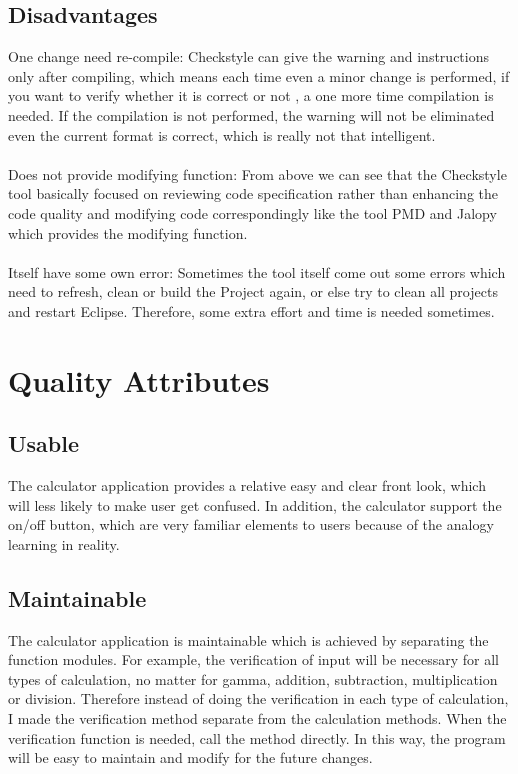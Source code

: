 \documentclass[a4paper, 11pt]{article}
\begin{document}
\subsection{Disadvantages}

One change need re-compile: Checkstyle can give the warning and instructions only after compiling, which means each time even a minor change is performed, if you want to verify whether it is correct or not , a one more time compilation is needed. If the compilation is not performed, the warning will not be eliminated even the current format is correct, which is really not that intelligent. \\\\
\noindent
Does not provide modifying function: From above we can see that the Checkstyle tool  basically focused on reviewing code specification rather than enhancing the code quality and modifying code correspondingly like the tool PMD and Jalopy which provides the modifying function.\\\\
\noindent
Itself have some own error: Sometimes the tool itself come out some errors which need to refresh, clean or build the Project again, or else try to clean all projects and restart Eclipse. Therefore, some extra effort and time is needed sometimes.
\newpage

\section{Quality Attributes}
\subsection{Usable}
\indent\indent The calculator application provides a relative easy and clear front look, which will less likely to make user get confused. In addition, the calculator support the on/off button, which are very familiar elements to users because of the analogy learning in reality. 
\subsection{Maintainable}
\indent\indent The calculator application is maintainable which is achieved by separating the function modules. For example, the verification of input will be necessary for all types of calculation, no matter for gamma, addition, subtraction, multiplication or division. Therefore instead of doing the verification in each type of calculation, I made the verification method separate from the calculation methods. When the verification function is needed, call the method directly. In this way, the program will be easy to maintain and modify for the future changes.
\end{document}
